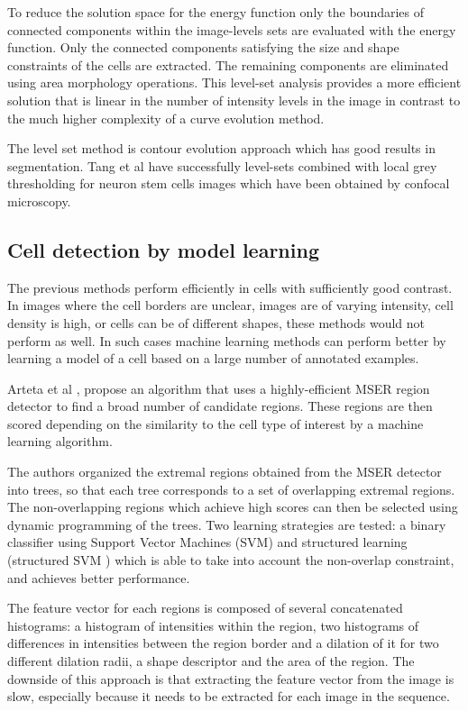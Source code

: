 \documentclass[12pt,a4paper,openany]{book}
\begin{document}
To reduce the solution space for the energy function only the boundaries of connected components within the image-levels sets are evaluated with the energy function. Only the connected components satisfying the size and shape constraints of the cells are extracted. The remaining components are eliminated using area morphology operations. This level-set analysis provides a more efficient solution that is linear in the number of intensity levels in the image in contrast to the much higher complexity of a curve evolution method.

The level set method is contour evolution approach which has good results in segmentation. Tang et al \cite{Tang??} have successfully level-sets combined with local grey thresholding \cite{xu10} for neuron stem cells images which have been obtained by confocal microscopy.

\subsection{Cell detection by model learning}

The previous methods perform efficiently in cells with sufficiently good contrast. In images where the cell borders are unclear, images are of varying intensity, cell density is high, or cells can be of different shapes, these methods would not perform as well. In such cases machine learning methods can perform better by learning a model of a cell based on a large number of annotated examples.

Arteta et al \cite{arteta12}\cite{arteta13},  propose an algorithm that uses a highly-efficient MSER region detector \cite{matas02} to find a broad number of candidate regions. These regions are then scored depending on the similarity to the cell type of interest by a machine learning algorithm. 

The authors organized the extremal regions obtained from the MSER detector into trees, so that each tree corresponds to a set of overlapping extremal regions. The non-overlapping regions which achieve high scores can then be selected using dynamic programming of the trees. Two learning strategies are tested: a binary classifier using Support Vector Machines (SVM) and structured learning (structured SVM \cite{joachims09}) which is able to take into account the non-overlap constraint, and achieves better performance.

The feature vector for each regions is composed of several concatenated histograms: a histogram of intensities within the region, two histograms of differences in intensities between the region border and a dilation of it for two different dilation radii, a shape descriptor and the area of the region. The downside of this approach is that extracting the feature vector from the image is slow, especially because it needs to be extracted for each image in the sequence.
\end{document}
